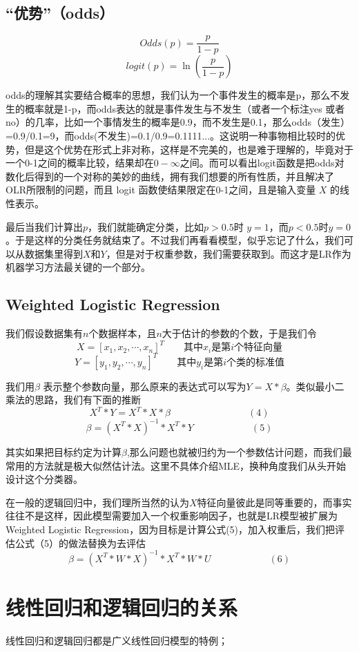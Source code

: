 \documentclass[12pt]{article}
\begin{document}
\subsection{“优势”（odds）}
$$
Odds(p) = \frac{p}{1-p}
$$
$$
logit(p) = \ln(\frac{p}{1-p})
$$

odds的理解其实要结合概率的思想，我们认为一个事件发生的概率是p，那么不发生的概率就是1-p，而odds表达的就是事件发生与不发生（或者一个标注yes 或者no）的几率，比如一个事情发生的概率是0.9，而不发生是0.1，那么odds（发生）=0.9/0.1=9，而odds(不发生)=0.1/0.9=0.1111...。这说明一种事物相比较时的优势，但是这个优势在形式上非对称，这样是不完美的，也是难于理解的，毕竟对于一个0-1之间的概率比较，结果却在$0-\infty$之间。而可以看出logit函数是把odds对数化后得到的一个对称的美妙的曲线，拥有我们想要的所有性质，并且解决了OLR所限制的问题，而且 logit 函数使结果限定在0-1之间，且是输入变量 $X$ 的线性表示。

最后当我们计算出$p$，我们就能确定分类，比如$p>0.5$时 $y=1$，而$p<0.5$时$y=0$。于是这样的分类任务就结束了。不过我们再看看模型，似乎忘记了什么，我们可以从数据集里得到$X$和$Y$，但是对于权重参数，我们需要获取到。而这才是LR作为机器学习方法最关键的一个部分。

\subsection{Weighted Logistic Regression}
我们假设数据集有$n$个数据样本，且$n$大于估计的参数的个数，于是我们令
$$
X = [x_1, x_2, \cdots, x_n]^T \qquad \text{其中}x_i\text{是第}i\text{个特征向量}
$$
$$
Y = [y_1, y_2, \cdots, y_n]^T \qquad \text{其中}y_i\text{是第}i\text{个类的标准值}
$$

我们用$\beta$ 表示整个参数向量，那么原来的表达式可以写为$Y = X*\beta$。类似最小二乘法的思路，我们有下面的推断
$$
X^T * Y = X^T * X * \beta \qquad \qquad \qquad \qquad(4)
$$
$$
\beta = (X^T * X)^{-1} * X^T * Y \qquad \qquad \qquad(5)
$$


其实如果把目标约定为计算$\beta$,那么问题也就被归约为一个参数估计问题，而我们最常用的方法就是极大似然估计法。这里不具体介绍MLE，换种角度我们从头开始设计这个分类器。

在一般的逻辑回归中，我们理所当然的认为$X$特征向量彼此是同等重要的，而事实往往不是这样，因此模型需要加入一个权重影响因子，也就是LR模型被扩展为Weighted Logistic Regression，因为目标是计算公式(5)，加入权重后，我们把评估公式（5）的做法替换为去评估
$$
\beta = (X^T * W * X)^{-1} * X^T * W * U \qquad \qquad \qquad(6)
$$

\section{线性回归和逻辑回归的关系}
线性回归和逻辑回归都是广义线性回归模型的特例；
\end{document}
